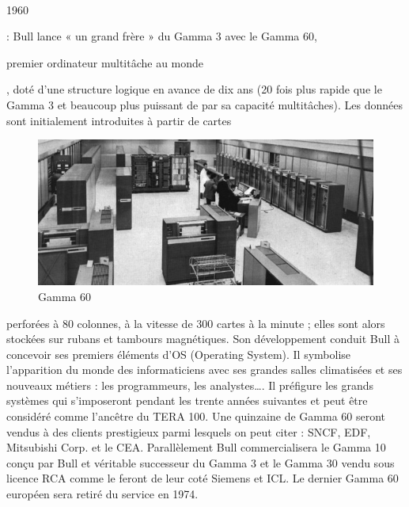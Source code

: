 \documentclass[11pt]{article}
\begin{document}
		\paragraph{}
		\begin{bf}1960\end{bf}: Bull lance « un grand frère » du Gamma 3 avec le Gamma 60, \begin{bf}premier ordinateur 
		multitâche au monde\end{bf}, doté d’une structure logique en avance de dix ans (20 fois plus rapide que le Gamma 3 et 
		beaucoup plus puissant de par sa capacité multitâches). Les données sont initialement introduites à partir de cartes 
		\begin{figure}
		\includegraphics[scale=0.2]{gamma60.jpg}
		\caption{Gamma 60}
		\end{figure}
		perforées à 80 colonnes, à la vitesse de 300 cartes à la minute ; elles sont alors stockées sur rubans et tambours 
		magnétiques. Son développement conduit Bull à concevoir ses premiers éléments d’OS (Operating System). Il symbolise 
		l’apparition du monde des informaticiens avec ses grandes salles climatisées et ses nouveaux métiers : 
		les programmeurs, les analystes…. Il préfigure les grands systèmes qui s’imposeront pendant les trente années 
		suivantes et peut être considéré comme l’ancêtre du TERA 100. Une quinzaine de Gamma 60 seront vendus à des clients 
		prestigieux parmi lesquels on peut citer : SNCF, EDF, Mitsubishi Corp. et le CEA. \newline{}
		\newline{}
		Parallèlement Bull commercialisera le Gamma 10 conçu par Bull et véritable successeur du Gamma 3 et le Gamma 30 vendu 
		sous licence RCA comme le feront de leur coté Siemens et ICL. Le dernier Gamma 60 européen sera retiré du service en 
		1974.
		\newline{}
		\newline{}
		\newline{}
		\newline{}
\end{document}
